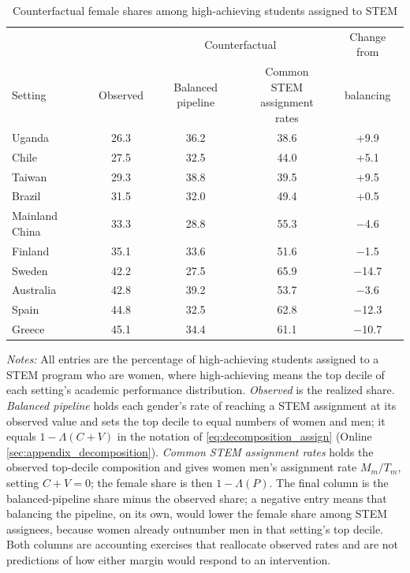 \begin{table}[htbp]
\centering
\caption{Counterfactual female shares among high-achieving students assigned to STEM}
\label{tab:counterfactuals}
\footnotesize
\setlength{\tabcolsep}{4pt}
\begin{tabular}{lcccc}
\toprule
 & & \multicolumn{2}{c}{Counterfactual} & Change from \\
\cmidrule(lr){3-4}
Setting & Observed & Balanced pipeline & \shortstack{Common STEM\\assignment rates} & balancing \\
\midrule
Uganda & 26.3 & 36.2 & 38.6 & +9.9 \\
Chile & 27.5 & 32.5 & 44.0 & +5.1 \\
Taiwan & 29.3 & 38.8 & 39.5 & +9.5 \\
Brazil & 31.5 & 32.0 & 49.4 & +0.5 \\
Mainland China & 33.3 & 28.8 & 55.3 & $-$4.6 \\
Finland & 35.1 & 33.6 & 51.6 & $-$1.5 \\
Sweden & 42.2 & 27.5 & 65.9 & $-$14.7 \\
Australia & 42.8 & 39.2 & 53.7 & $-$3.6 \\
Spain & 44.8 & 32.5 & 62.8 & $-$12.3 \\
Greece & 45.1 & 34.4 & 61.1 & $-$10.7 \\
\bottomrule
\end{tabular}
\begin{minipage}{\textwidth}\vspace{4pt}\scriptsize \textit{Notes:} All entries are the percentage of high-achieving students assigned to a STEM program who are women, where high-achieving means the top decile of each setting's academic performance distribution. \textit{Observed} is the realized share. \textit{Balanced pipeline} holds each gender's rate of reaching a STEM assignment at its observed value and sets the top decile to equal numbers of women and men; it equals $1-\Lambda(C+V)$ in the notation of \eqref{eq:decomposition_assign} (Online \ref{sec:appendix_decomposition}). \textit{Common STEM assignment rates} holds the observed top-decile composition and gives women men's assignment rate $M_m/T_m$, setting $C+V=0$; the female share is then $1-\Lambda(P)$. The final column is the balanced-pipeline share minus the observed share; a negative entry means that balancing the pipeline, on its own, would lower the female share among STEM assignees, because women already outnumber men in that setting's top decile. Both columns are accounting exercises that reallocate observed rates and are not predictions of how either margin would respond to an intervention.\end{minipage}
\end{table}
